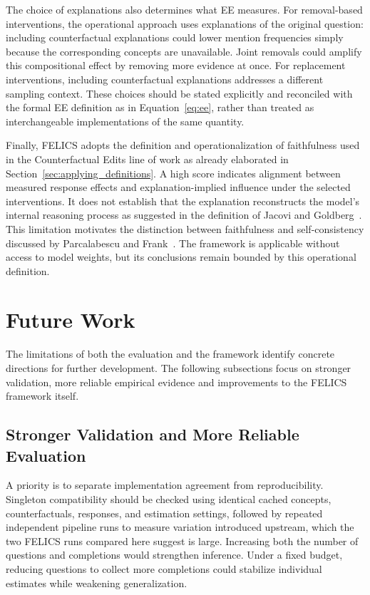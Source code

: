 The choice of explanations also determines what EE measures. For removal-based interventions, the operational approach uses explanations of the original question: including counterfactual explanations could lower mention frequencies simply because the corresponding concepts are unavailable. Joint removals could amplify this compositional effect by removing more evidence at once. For replacement interventions, including counterfactual explanations addresses a different sampling context. These choices should be stated explicitly and reconciled with the formal EE definition as in Equation~\ref{eq:ee}, rather than treated as interchangeable implementations of the same quantity.

Finally, FELICS adopts the definition and operationalization of faithfulness used in the Counterfactual Edits line of work as already elaborated in Section~\ref{sec:applying_definitions}. A high score indicates alignment between measured response effects and explanation-implied influence under the selected interventions. It does not establish that the explanation reconstructs the model's internal reasoning process as suggested in the definition of Jacovi and Goldberg~\cite{jacoviFaithfullyInterpretableNLP2020}. This limitation motivates the distinction between faithfulness and self-consistency discussed by Parcalabescu and Frank~\cite{parcalabescuMeasuringFaithfulnessSelfconsistency2024}. The framework is applicable without access to model weights, but its conclusions remain bounded by this operational definition.

\section{Future Work}
\label{sec:future_work}

The limitations of both the evaluation and the framework identify concrete directions for further development. The following subsections focus on stronger validation, more reliable empirical evidence and improvements to the FELICS framework itself.

\subsection{Stronger Validation and More Reliable Evaluation}

A priority is to separate implementation agreement from reproducibility. Singleton compatibility should be checked using identical cached concepts, counterfactuals, responses, and estimation settings, followed by repeated independent pipeline runs to measure variation introduced upstream, which the two FELICS runs compared here suggest is large. Increasing both the number of questions and completions would strengthen inference. Under a fixed budget, reducing questions to collect more completions could stabilize individual estimates while weakening generalization.

